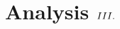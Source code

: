 \documentclass[ngerman]{scrartcl}
\newcommand{\RM}[1]{\MakeUppercase{\romannumeral #1{.}}}
\theoremstyle{definition}
\theoremstyle{definition}
\theoremstyle{remark}
\begin{document}
\title{Analysis $\RM{3}$}



\newpage








\end{document}
